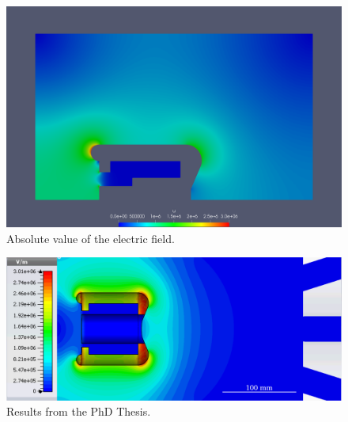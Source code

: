 \begin{center}
\begin{figure}[p]
  \includegraphics[width=\textwidth]{figures/insulator/gradient}
  \caption{Absolute value of the electric field.}
  \label{fig:electric_field}
\end{figure}
\end{center}

\begin{center}
\begin{figure}[p]
  \includegraphics[width=\textwidth]{figures/insulator/electric_field}
  \caption{Results from the PhD Thesis.}
  \label{fig:phd_electric_field}
\end{figure}
\end{center}


